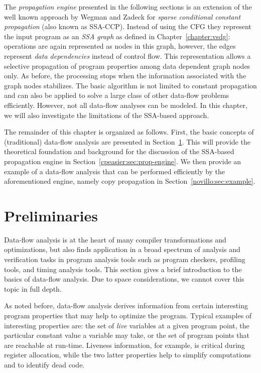 The \emph{propagation engine} presented in the following sections is an
extension of the well known approach by Wegman and Zadeck for \emph{sparse
conditional constant propagation} (also known as
SSA-CCP). Instead of using the CFG they represent the input program as an
\emph{SSA graph} as defined in Chapter~\ref{chapter:vsdg}: operations are again
represented as
nodes in this graph, however, the edges represent \emph{data dependencies}
instead of control flow. This representation allows a selective propagation of
program properties among data dependent graph nodes only. As before, the
processing stops when the information associated with the graph nodes stabilizes.
The basic algorithm is not limited to constant propagation and can also be
applied to solve a large class of other data-flow problems
efficiently. However, not all data-flow
analyses can be modeled. In this chapter, we will also investigate the limitations
of the SSA-based approach.

The remainder of this chapter is organized as follows. First, the basic concepts
of (traditional) data-flow analysis are presented in
Section~\ref{novillo:sec:preliminaries}. This will provide the theoretical
foundation and background for the discussion of the SSA-based propagation
engine in Section~\ref{cpeasier:sec:prop-engine}. We then provide an example of 
a
data-flow analysis that can be performed efficiently by the aforementioned
engine, namely copy propagation in Section~\ref{novillo:sec:example}.

\section{Preliminaries}
\label{novillo:sec:preliminaries}

Data-flow analysis
is at the heart of many compiler transformations and
optimizations, but also finds application in a broad spectrum of analysis and
verification tasks in program analysis tools such as program checkers, profiling
tools, and timing analysis tools. This section gives a brief introduction to the
basics of data-flow analysis. Due to space considerations, we cannot cover this
topic in full depth.

As noted before, data-flow analysis derives information from certain
interesting program properties that may help to optimize the program. Typical
examples of interesting properties are: the set of \emph{live} variables at a
given program point, the particular constant value a variable may take, or the
set of program points that are reachable at run-time. Liveness information, for
example, is critical during register allocation, while the two latter properties
help to simplify computations and to identify dead code.


